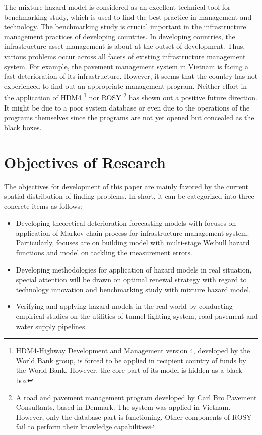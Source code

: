 The mixture hazard model is considered as an excellent technical tool for benchmarking study, which is used to find the best practice in management and technology. The benchmarking study is crucial important in the infrastructure management practices of developing countries. In developing countries, the infrastructure asset management is about at the outset of development. Thus, various problems occur across all facets of existing infrastructure management system. For example, the pavement management system in Vietnam is facing a fast deterioration of its infrastructure\cite{namieee}. However, it seems that the country has not experienced to find out an appropriate management program. Neither effort in the application of HDM4 \footnote{HDM4-Highway Development and Management version 4, developed by the World Bank group, is forced to be applied in recipient country of funds by the World Bank. However, the core part of its model is hidden as a black box} nor ROSY \footnote{A road and pavement management program developed by Carl Bro Pavement Consultants, based in Denmark. The system was applied in Vietnam. However, only the database part is functioning. Other components of ROSY fail to perform their knowledge capabilities} has shown out a positive future direction. It might be due to a poor system database or even due to the operations of the programs themselves since the programs are not yet opened but concealed as the black boxes.
\section{Objectives of Research}
The objectives for development of this paper are mainly favored by the current spatial distribution of finding problems. In short, it can be categorized into three concrete items as follows:
\begin{itemize}
\item {Developing theoretical deterioration forecasting models with focuses on application of Markov chain process for infrastructure management system. Particularly, focuses are on building model with multi-stage Weibull hazard functions and model on tackling the measurement errors.}
\item {Developing methodologies for application of hazard models in real situation, special attention will be drawn on optimal renewal strategy with regard to technology innovation and benchmarking study with mixture hazard model.} 
\item {Verifying and applying hazard models in the real world by conducting empirical studies on the utilities of tunnel lighting system, road pavement and water supply pipelines.}
\end{itemize}
